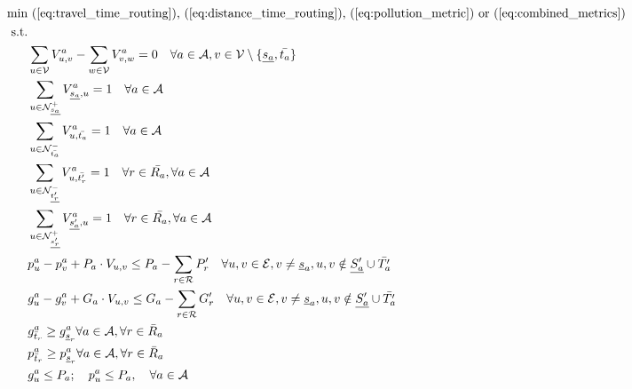 \begin{align}
	\text{min}&  \text{
	(\ref{eq:travel_time_routing}), (\ref{eq:distance_time_routing}), (\ref{eq:pollution_metric}) or (\ref{eq:combined_metrics})
	}\nonumber\\
	\text{s.t.} &\nonumber\\
&\sum_{u \in \mathcal{V}} V^a_{u, v} - \sum_{w \in \mathcal{V}} V^a_{v, w} = 0 \quad \forall a \in \mathcal{A}, v \in \mathcal{V} \setminus \{\underline{s_a}, \bar{t_a}\} \label{eq:flow_conservation_graph_u} \\
&\sum_{ u \in \mathcal{N}^+_{\underline{s_a}} }V^a_{ \underline{s_a},u} = 1 \quad \forall a \in \mathcal{A} \label{eq:flow_cons_arrival_graph_u}\\
&\sum_{u \in \mathcal{N}^-_{\bar{t_a}} } V^a_{u, \bar{t_a}} = 1 \quad \forall a \in \mathcal{A} \label{eq:flow_cons_departure_graph_u}\\
&\sum_{u \in \mathcal{N}^-_{\underline{t'_r}} } V^a_{u, \bar{t'_r}} = 1 \quad \forall r \in \bar{R_a}, \forall a \in \mathcal{A} 	\label{eq:flow_cons_arrival_graph_v_u}\\
&\sum_{u \in \mathcal{N}^+_{\underline{s'_r}} } V^a_{ \underline{s'_a},u} = 1 \quad \forall r \in \bar{R_a}, \forall a \in \mathcal{A}\label{eq:flow_cons_departure_graph_v_u}\\
&{p^a_u - p^a_v + P_a \cdot V_{u,v} \leq P_{a} - \sum_{r\in\mathcal{R}}P'_r \quad \forall u, v \in \mathcal{E}, v \neq \underline{s}_a}, u, v  \notin \underline{S'_a} \cup \bar{T'_a} \label{eq:no_sub_tour_g}\\
&{g^a_u - g^a_v + G_a \cdot V_{u,v} \leq G_{a} - \sum_{r\in\mathcal{R}}G'_r \quad \forall u, v \in \mathcal{E}, v \neq \underline{s}_a}, u, v  \notin \underline{S'_a} \cup \bar{T'_a} \label{eq:no_sub_tour_p}\\
& g^a_{\bar{t}_r} \ge g^a_{\underline{s}_r} \forall a \in \mathcal{A}, \forall r \in \bar{R}_a\label{eq:special_cons_goods}\\
& p^a_{\bar{t}_r} \ge p^a_{\underline{s}_r} \forall a \in \mathcal{A}, \forall r \in \bar{R}_a\label{eq:special_cons_people}\\
&g^a_u \leq P_a;\quad p^a_u \leq P_a,   \quad\forall a \in \mathcal{A}\label{eq:final_req}\\
\nonumber
\end{align}
